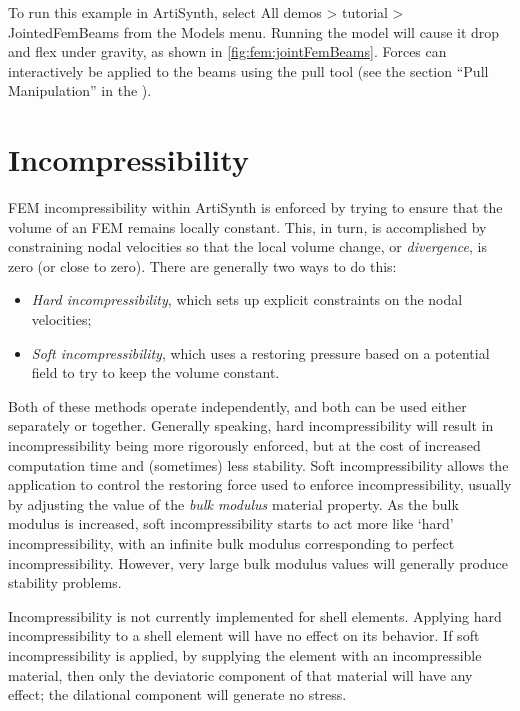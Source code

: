 To run this example in ArtiSynth, select {\sf All demos > tutorial >
JointedFemBeams} from the {\sf Models} menu. Running the model will
cause it drop and flex under gravity, as shown in 
\ref{fig:fem:jointFemBeams}. Forces can interactively
be applied to the beams using
the pull tool
(see the section ``Pull Manipulation'' in the
).

\section{Incompressibility}

FEM incompressibility within ArtiSynth is enforced by trying to ensure
that the volume of an FEM remains locally constant. This, in turn, is
accomplished by constraining nodal velocities so that the local volume change,
or \emph{divergence}, is zero (or close to zero). There are generally two
ways to do this:

\begin{itemize}
\item {\it Hard incompressibility}, which sets up explicit constraints on the
nodal velocities;
\item {\it Soft incompressibility}, which uses a restoring pressure based on a
potential field to try to keep the volume constant.
\end{itemize}

Both of these methods operate independently, and both can be used
either separately or together. Generally speaking, hard incompressibility
will result in incompressibility being more rigorously enforced, but
at the cost of increased computation time and (sometimes) less
stability. Soft incompressibility allows the application to control
the restoring force used to enforce incompressibility, usually by
adjusting the value of the \emph{bulk modulus} material property.  As
the bulk modulus is increased, soft incompressibility starts to act
more like `hard' incompressibility, with an infinite bulk modulus
corresponding to perfect incompressibility. However, very large bulk
modulus values will generally produce stability problems.

\begin{sideblock}
Incompressibility is not currently implemented for shell
elements. Applying hard incompressibility to a shell element will have
no effect on its behavior. If soft incompressibility is applied,
by supplying the  element with an incompressible material, then only
the deviatoric component of that material will have any effect; the
dilational component will generate no stress.
\end{sideblock}

